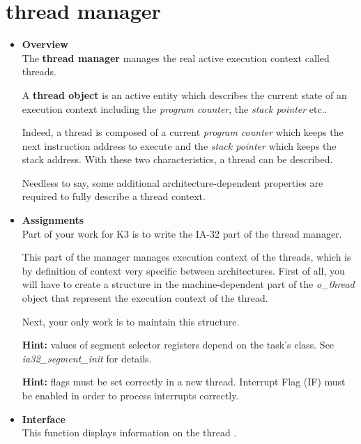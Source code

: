 \section{\textbf{thread} manager}
\begin{itemize}
  \item {\bf Overview}\\

    The \textbf{thread manager} manages the real active execution
    context called threads.

    A \textbf{thread object} is an active entity which describes the
    current state of an execution context including the
    \textit{program counter}, the \textit{stack pointer} etc..

    Indeed, a thread is composed of a current \textit{program counter}
    which keeps the next instruction address to execute and the
    \textit{stack pointer} which keeps the stack address. With these
    two characteristics, a thread can be described.

    Needless to say, some additional architecture-dependent properties
    are required to fully describe a thread context.

  \item {\bf Assignments}\\

    Part of your work for K3 is to write the IA-32 part of the thread
    manager.

    This part of the manager manages execution context of the threads,
    which is by definition of context very specific between
    architectures. First of all, you will have to create a structure
    in the machine-dependent part of the \emph{o\_thread} object that
    represent the execution context of the thread.

    Next, your only work is to maintain this structure.

    \textbf{Hint:} values of segment selector registers depend on the
    task's class. See \emph{ia32\_segment\_init} for details.

    \textbf{Hint:} flags must be set correctly in a new
    thread. Interrupt Flag (IF) must be enabled in order to process
    interrupts correctly.

  \item {\bf Interface}\\

	 {
	   This function displays information on the thread .
	 }


\end{itemize}
